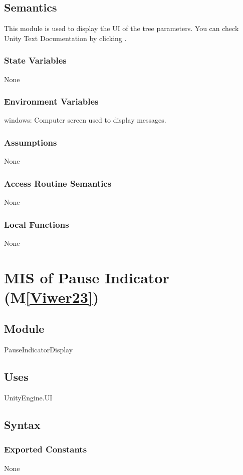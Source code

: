 \documentclass[12pt, titlepage]{article}
\newcommand{\mref}[1]{M\ref{#1}}
\begin{document}
\subsection{Semantics}
This module is used to display the UI of the tree parameters.
You can check Unity Text Documentation by clicking \tref.
\subsubsection{State Variables}
None
\subsubsection{Environment Variables}
windows: Computer screen used to display messages.
\subsubsection{Assumptions}
None
\subsubsection{Access Routine Semantics}
None
\subsubsection{Local Functions}
None

\newpage


\section{MIS of Pause Indicator (\mref{Viwer23})} 

\subsection{Module}
PauseIndicatorDisplay

\subsection{Uses}
UnityEngine.UI 

\subsection{Syntax}

\subsubsection{Exported Constants}
None
\end{document}
